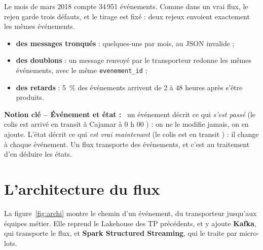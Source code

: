 \documentclass[11pt,a4paper]{article}
\newcommand{\cmd}[1]{\texttt{#1}}
\newenvironment{notion}[1][]{\par\medskip\noindent\textbf{\textcolor{lhblue}{Notion clé\if\relax\detokenize{#1}\relax\else{} -- #1\fi{} :}}\ }{\par\medskip}
\begin{document}
Le mois de mars 2018 compte 34\,951 événements. Comme dans un vrai flux, le rejeu garde trois
défauts, et le tirage est fixé : deux rejeux envoient exactement les mêmes événements.
\begin{itemize}[leftmargin=*,nosep]
  \item \textbf{des messages tronqués} : quelques-uns par mois, au JSON invalide ;
  \item \textbf{des doublons} : un message renvoyé par le transporteur redonne les mêmes événements, avec le même \cmd{evenement\_id} ;
  \item \textbf{des retards} : 5~\% des événements arrivent de 2 à 48 heures après s'être produits.
\end{itemize}

\begin{notion}[Événement et état]
un événement décrit ce qui \emph{s'est passé} (\og le colis est
arrivé en transit à Cajamar à 0 h 00 \fg{}) : on ne le modifie jamais, on en ajoute. L'état décrit
ce qui \emph{est vrai maintenant} (\og le colis est en transit \fg{}) : il change à chaque
événement. Un flux transporte des événements, et c'est au traitement d'en déduire les états.
\end{notion}

\section{L'architecture du flux}

La figure~\ref{fig:archi} montre le chemin d'un événement, du transporteur jusqu'aux équipes métier.
Elle reprend le Lakehouse des TP précédents, et y ajoute \textbf{Kafka}, qui transporte le flux, et
\textbf{Spark Structured Streaming}, qui le traite par micro-lots.
\end{document}
